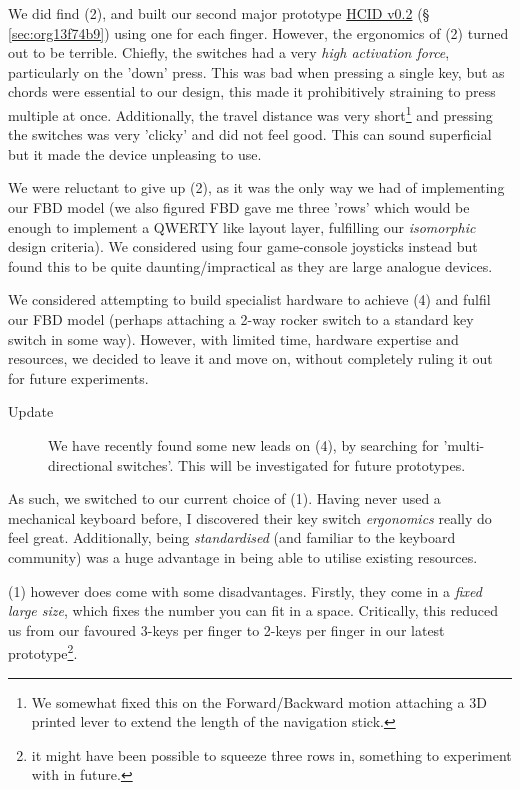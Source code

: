 \documentclass[logo,bsc,singlespacing,parskip]{infthesis}
\begin{document}
We did find (2), and built our second major prototype \hyperref[sec:org13f74b9]{HCID v0.2} (§ \ref{sec:org13f74b9}) using one for each finger.
However, the ergonomics of (2) turned out to be terrible.
Chiefly, the switches had a very \emph{high activation force}, particularly on the 'down' press.
This was bad  when pressing a single key, but as chords were essential to our design, this made it prohibitively straining to press multiple at once.
Additionally, the travel distance was very short\footnote{We somewhat fixed this on the Forward/Backward motion attaching a 3D printed lever to extend the length of the navigation stick.} and pressing the switches was very 'clicky' and did not feel good.
This can sound superficial but it made the device unpleasing to use.

We were reluctant to give up (2), as it was the only way we had of implementing our FBD model (we also figured FBD gave me three 'rows' which would be enough to implement a QWERTY like layout layer, fulfilling our \emph{isomorphic} design criteria).
We considered using four game-console joysticks instead but found this to be quite daunting/impractical as they are large analogue devices.

We considered attempting to build specialist hardware to achieve (4) and fulfil our FBD model (perhaps attaching a 2-way rocker switch to a standard key switch in some way).
However, with limited time, hardware expertise and resources, we decided to leave it and move on, without completely ruling it out for future experiments. \\

\begin{mdframed}
\begin{description}
\item[{Update}] We have recently found some new leads on (4), by searching for 'multi-directional switches'.
This will be investigated for future prototypes.
\end{description}
\end{mdframed}


As such, we switched to our current choice of (1).
Having never used a mechanical keyboard before, I discovered their key switch \emph{ergonomics} really do feel great.
Additionally, being \emph{standardised} (and familiar to the keyboard community) was a huge advantage in being able to utilise existing resources.

(1) however does come with some disadvantages.
Firstly, they come in a \emph{fixed large size}, which fixes the number you can fit in a space.
Critically, this reduced us from our favoured 3-keys per finger to 2-keys per finger in our latest prototype\footnote{it might have been possible to squeeze three rows in, something to experiment with in future.}.
\end{document}
